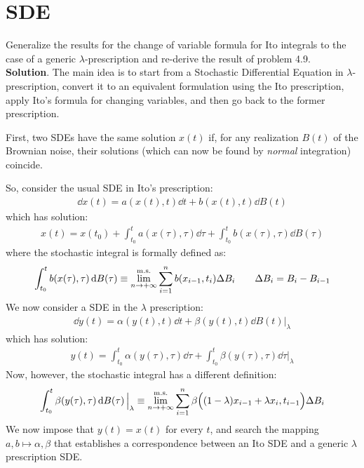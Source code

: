 \documentclass[../template.tex]{subfiles}
\begin{document}
\section{SDE}
\begin{exo}
Generalize the results for the change of variable formula for Ito integrals to the case of a generic $\lambda$-prescription and re-derive the result of problem 4.9.\\

\textbf{Solution}. The main idea is to start from a Stochastic Differential Equation in $\lambda$-prescription, convert it to an equivalent formulation using the Ito prescription, apply Ito's formula for changing variables, and then go back to the former prescription.

First, two SDEs have the same solution $x(t)$ if, for any realization $B(t)$ of the Brownian noise, their solutions (which can now be found by \textit{normal} integration) coincide.

So, consider the usual SDE in Ito's prescription:
\begin{align*}
    \dd{x(t)} = a(x(t),t) \dd{t} + b(x(t),t) \dd{B(t)}
\end{align*}
which has solution:
\begin{align*}
    x(t) = x(t_0) + \int_{t_0}^t a(x(\tau),\tau) \dd{\tau} + \int_{t_0}^t b(x(\tau), \tau) \dd{B(\tau)}
\end{align*}
where the stochastic integral is formally defined as:
\begin{align*}
    \int_{t_0}^t b(x(\tau),\tau) \dd{B(\tau)} \equiv \overset{\rm m.s.}{\lim_{n \to +\infty}} \sum_{i=1}^n b(x_{i-1}, t_i) \Delta B_i \qquad \Delta B_i = B_i - B_{i-1}
\end{align*}
We now consider a  SDE in the $\lambda$ prescription:
\begin{align*}
    \dd{y(t)} = \alpha(y(t),t) \dd{t} + \beta(y(t),t) \dd{B(t)} \big|_{\lambda}
\end{align*}
which has solution:
\begin{align*}
    y(t) = \int_{t_0}^t \alpha(y(\tau), \tau) \dd{\tau} + \int_{t_0}^t \beta(y(\tau), \tau) \dd{\tau} \Big|_{\lambda}
\end{align*}
Now, however, the stochastic integral has a different definition:
\begin{align*}
    \int_{t_0}^t \beta(y(\tau), \tau) \dd{B(\tau)} \Big|_{\lambda} \equiv \overset{\rm m.s.}{\lim_{n \to +\infty}} \sum_{i=1}^n \beta\Big( (1-\lambda) x_{i-1} + \lambda x_i, t_{i-1}\Big) \Delta B_i
\end{align*}
We now impose that $y(t) = x(t)$ for every $t$, and search the mapping $a,b \mapsto \alpha, \beta$ that establishes a correspondence between an Ito SDE and a generic $\lambda$ prescription SDE.\\


\end{exo}
\end{document}
